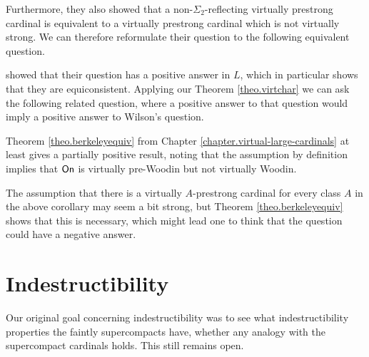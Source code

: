 \documentclass[../../main]{subfiles}
\begin{document}
\qquad Furthermore, they also showed that a non-$\Sigma_2$-reflecting virtually prestrong cardinal is equivalent to a virtually prestrong cardinal which is not virtually strong. We can therefore reformulate their question to the following equivalent question.


\cite{RemarkableWilson} showed that their question has a positive answer in $L$, which in particular shows that they are equiconsistent. Applying our Theorem \ref{theo.virtchar} we can ask the following related question, where a positive answer to that question would imply a positive answer to Wilson's question.


Theorem \ref{theo.berkeleyequiv} from Chapter \ref{chapter.virtual-large-cardinals} at least gives a partially positive result, noting that the assumption by definition implies that $\textsf{On}$ is virtually pre-Woodin but not virtually Woodin.


The assumption that there is a virtually $A$-prestrong cardinal for every class $A$ in the above corollary may seem a bit strong, but Theorem \ref{theo.berkeleyequiv} shows that this is necessary, which might lead one to think that the question could have a negative answer. 



\section{Indestructibility}

Our original goal concerning indestructibility was to see what indestructibility properties the faintly supercompacts have, whether any analogy with the supercompact cardinals holds. This still remains open.

\end{document}
